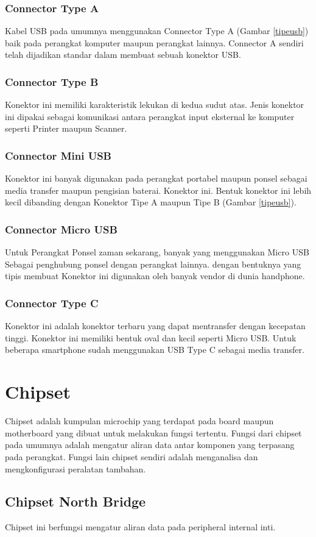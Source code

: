 \subsubsection{Connector Type A}
Kabel USB pada umumnya menggunakan Connector Type A (Gambar \ref{tipeusb}) baik pada perangkat komputer maupun perangkat lainnya. Connector A sendiri telah dijadikan standar dalam membuat sebuah konektor USB.
\subsubsection{Connector Type B}
Konektor ini memiliki karakteristik lekukan di kedua sudut atas. Jenis konektor ini dipakai sebagai komunikasi antara perangkat input eksternal ke komputer seperti Printer maupun Scanner.
\subsubsection{Connector Mini USB}
Konektor ini banyak digunakan pada perangkat portabel maupun ponsel sebagai media transfer maupun pengisian baterai. Konektor ini. Bentuk konektor ini lebih kecil dibanding dengan Konektor Tipe A maupun Tipe B (Gambar \ref{tipeusb}).
\subsubsection{Connector Micro USB}
Untuk Perangkat Ponsel zaman sekarang, banyak yang menggunakan Micro USB Sebagai penghubung ponsel dengan perangkat lainnya. dengan bentuknya yang tipis membuat Konektor ini digunakan oleh banyak vendor di dunia handphone.
\subsubsection{Connector Type C}
Konektor ini adalah konektor terbaru yang dapat mentransfer dengan kecepatan tinggi. Konektor ini memiliki bentuk oval dan kecil seperti Micro USB. Untuk beberapa smartphone sudah menggunakan USB Type C sebagai media transfer.
\section{Chipset}
Chipset adalah kumpulan microchip yang terdapat pada board maupun motherboard yang dibuat untuk melakukan fungsi tertentu. Fungsi dari chipset pada umumnya adalah mengatur aliran data antar komponen yang terpasang pada perangkat. Fungsi lain chipset sendiri adalah menganalisa dan mengkonfigurasi peralatan tambahan.
\subsection{Chipset North Bridge}
Chipset ini berfungsi mengatur aliran data pada peripheral internal inti.
